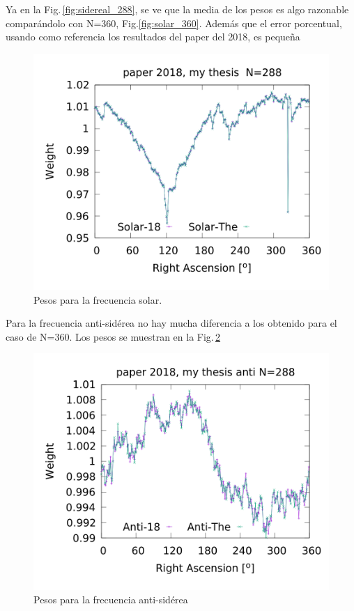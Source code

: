 	Ya en la Fig.\,\ref{fig:sidereal_288}, se ve que la media de los pesos es algo razonable comparándolo con N=360, Fig.\ref{fig:solar_360}. Además que el error porcentual, usando como referencia los resultados del paper del 2018, es pequeña

	\begin{figure}[H]
	\centering
	\includegraphics[width=\linewidth]{Graficos/solar_my_and_paper_2018_in_288.png}
	\caption{Pesos para la frecuencia solar.}
	\label{fig:solar_288}
	\end{figure}


	Para la frecuencia anti-sidérea no hay mucha diferencia a los obtenido para el caso de N=360. Los pesos se muestran en la Fig.\,\ref{fig:anti_288} 
	\begin{figure}[H]
	\centering
	\includegraphics[width=\linewidth]{Graficos/anti_my_and_paper_2018_in_288.png}
	\caption{Pesos para la frecuencia anti-sidérea}
	\label{fig:anti_288}
	\end{figure}
